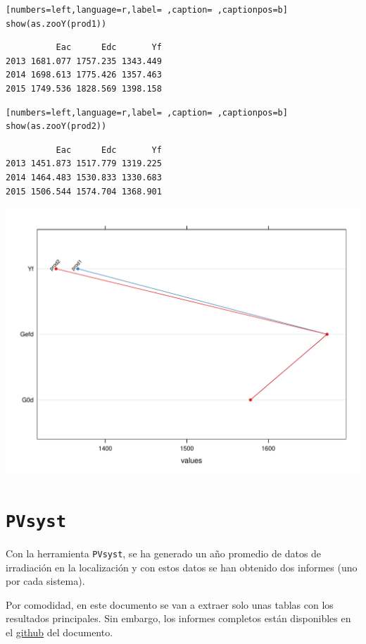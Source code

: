 \begin{lstlisting}[numbers=left,language=r,label= ,caption= ,captionpos=b]
show(as.zooY(prod1))
\end{lstlisting}

\begin{verbatim}
          Eac      Edc       Yf
2013 1681.077 1757.235 1343.449
2014 1698.613 1775.426 1357.463
2015 1749.536 1828.569 1398.158
\end{verbatim}


\begin{lstlisting}[numbers=left,language=r,label= ,caption= ,captionpos=b]
show(as.zooY(prod2))
\end{lstlisting}

\begin{verbatim}
          Eac      Edc       Yf
2013 1451.873 1517.779 1319.225
2014 1464.483 1530.833 1330.683
2015 1506.544 1574.704 1368.901
\end{verbatim}


\begin{center}
\includegraphics[width=.9\linewidth]{figuras/ejemplos2.pdf}
\end{center}
\section{\texttt{PVsyst}}
\label{sec:org3232024}
Con la herramienta \texttt{PVsyst}, se ha generado un año promedio de datos de irradiación en la localización y con estos datos se han obtenido dos informes (uno por cada sistema).

Por comodidad, en este documento se van a extraer solo unas tablas con los resultados principales. Sin embargo, los informes completos están disponibles en el \href{https://github.com/solarization/TFG\_Francisco\_Delgado\_Lopez}{github} del documento.

